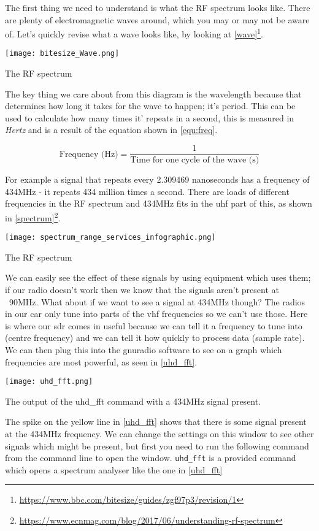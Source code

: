 The first thing we need to understand is what the \gls{RF} spectrum looks like. There are plenty of electromagnetic waves around, which you may or may not be aware of. Let's quickly revise what a wave looks like, by looking at \cref{wave}\footnote{\url{https://www.bbc.com/bitesize/guides/zgf97p3/revision/1}}.

\centrefigurestart
\texttt{[image: bitesize\_Wave.png]}
\caption{The RF spectrum}
\label{wave}
\centrefigureend

The key thing we care about from this diagram is the wavelength because that determines how long it takes for the wave to happen; it's period. This can be used to calculate how many times it' repeats in a second, this is measured in \textit{Hertz} and is a result of the equation shown in \cref{equ:freq}. 

\begin{equation}
\text{Frequency (Hz)} = \frac{1}{\text{Time for one cycle of the wave (s)}}
\label{equ:freq}
\end{equation}

For example a signal that repeats every 2.309469 nanoseconds has a frequency of 434MHz - it repeats 434 million times a second. There are loads of different frequencies in the \gls{RF} spectrum and 434MHz fits in the \gls{uhf} part of this, as shown in \cref{spectrum}\footnote{\url{https://www.ecnmag.com/blog/2017/06/understanding-rf-spectrum}}.

\centrefigurestart
\texttt{[image: spectrum\_range\_services\_infographic.png]}
\caption{The RF spectrum}
\label{spectrum}
\centrefigureend

We can easily see the effect of these signals by using equipment which uses them; if our radio doesn't work then we know that the signals aren't present at ~90MHz. What about if we want to see a signal at 434MHz though? The radios in our car only tune into parts of the \gls{vhf} frequencies so we can't use those. Here is where our \gls{sdr} comes in useful because we can tell it a frequency to tune into (centre frequency) and we can tell it how quickly to process data (sample rate). We can then plug this into the gnuradio software to see on a graph which frequencies are most powerful, as seen in \cref{uhd_fft}.

\centrefigurestart
\texttt{[image: uhd\_fft.png]}
\caption{The output of the uhd\_fft command with a 434MHz signal present.}
\label{uhd_fft}
\centrefigureend

The spike on the yellow line in \cref{uhd_fft} shows that there is some signal present at the 434MHz frequency. We can change the settings on this window to see other signals which might be present, but first you need to run the following command from the command line to open the window. \verb|uhd_fft| is a provided command which opens a spectrum analyser like the one in \cref{uhd_fft}

